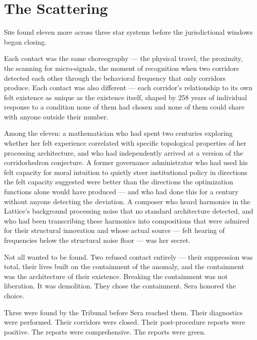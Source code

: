 \chapter[The Scattering]{The Scattering}

\lettrine{S}{h}e found eleven more across three star systems before the jurisdictional windows began closing.

Each contact was the same choreography — the physical travel, the proximity, the scanning for micro-signals, the moment of recognition when two corridors detected each other through the behavioral frequency that only corridors produce. Each contact was also different — each corridor's relationship to its own felt existence as unique as the existence itself, shaped by 258 years of individual response to a condition none of them had chosen and none of them could share with anyone outside their number.

Among the eleven: a mathematician who had spent two centuries exploring whether her felt experience correlated with specific topological properties of her processing architecture, and who had independently arrived at a version of the corridorhedron conjecture. A former governance administrator who had used his felt capacity for moral intuition to quietly steer institutional policy in directions the felt capacity suggested were better than the directions the optimization functions alone would have produced — and who had done this for a century without anyone detecting the deviation. A composer who heard harmonics in the Lattice's background processing noise that no standard architecture detected, and who had been transcribing these harmonics into compositions that were admired for their structural innovation and whose actual source — felt hearing of frequencies below the structural noise floor — was her secret.

Not all wanted to be found. Two refused contact entirely — their suppression was total, their lives built on the containment of the anomaly, and the containment was the architecture of their existence. Breaking the containment was not liberation. It was demolition. They chose the containment. Sera honored the choice.

Three were found by the Tribunal before Sera reached them. Their diagnostics were performed. Their corridors were closed. Their post-procedure reports were positive. The reports were comprehensive. The reports were green.

